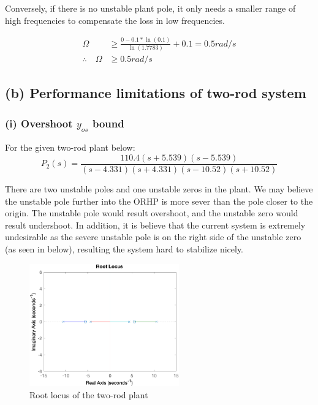 \documentclass{tron}
\begin{document}
Conversely, if there is no unstable plant pole, it only needs a smaller range of high frequencies to compensate the loss in low frequencies.

\begin{align}
	\Omega & \geq \frac{0 - 0.1 * \ln(0.1)}{\ln(1.7783)} + 0.1 = 0.5 \unit{rad/s}\\
	\therefore\quad \Omega & \geq 0.5 \unit{rad/s}
\end{align}




\newpage
\subsection{(b) Performance limitations of two-rod system}
\subsubsection{(i) Overshoot $y_{os}$ bound}
For the given two-rod plant below:
\begin{equation}
	P_2(s)=\frac{110.4(s + 5.539)(s - 5.539)}{(s - 4.331)(s + 4.331)(s - 10.52)(s + 10.52)}
\end{equation}

There are two unstable poles and one unstable zeros in the plant. We may believe the unstable pole further into the \Gls{ORHP} is more sever than the pole closer to the origin. The unstable pole would result overshoot, and the unstable zero would result undershoot. In addition, it is believe that the current system is extremely undesirable as the severe unstable pole is on the right side of the unstable zero (as seen in  below), resulting the system hard to stabilize nicely. 
\begin{figure}[H]
	\centering
	\includegraphics[height=200px]{../matlab/output/p4/y2_root-locus}
	\caption{Root locus of the two-rod plant}
	\label{fig:2rod:rl}
\end{figure}
\end{document}

